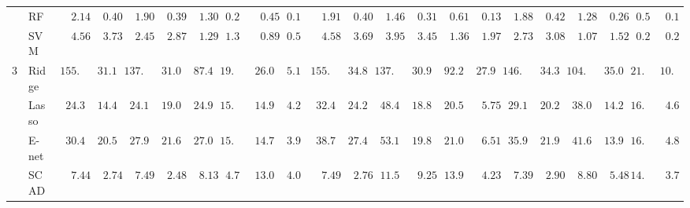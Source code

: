 \begin{tabular}{p{0.2cm}p{1cm}|p{0.6cm}p{0.6cm}|p{0.6cm}p{0.6cm}p{0.6cm}p{0.6cm}p{0.6cm}p{0.6cm}|p{0.6cm}p{0.6cm}p{0.6cm}p{0.6cm}p{0.6cm}p{0.6cm}|p{0.6cm}p{0.6cm}p{0.6cm}p{0.6cm}p{0.6cm}p{0.6cm}}
 & RF  & $\phantom{00}2.14$ & $\phantom{00}0.40$ & $\phantom{00}1.90$ & $\phantom{00}0.39$ & $\phantom{00}1.30$ & $\phantom{0}0.28$ & $\phantom{00}0.45$ & $\phantom{0}0.10$ & $\phantom{00}1.91$ & $\phantom{00}0.40$ & $\phantom{00}1.46$ & $\phantom{00}0.31$ & $\phantom{00}0.61$ & $\phantom{00}0.13$ & $\phantom{00}1.88$ & $\phantom{00}0.42$ & $\phantom{00}1.28$ & $\phantom{00}0.26$ & $\phantom{0}0.54$ & $\phantom{0}0.12$ \\
 & SVM  & $\phantom{00}4.56$ & $\phantom{00}3.73$ & $\phantom{00}2.45$ & $\phantom{00}2.87$ & $\phantom{00}1.29$ & $\phantom{0}1.35$ & $\phantom{00}0.89$ & $\phantom{0}0.54$ & $\phantom{00}4.58$ & $\phantom{00}3.69$ & $\phantom{00}3.95$ & $\phantom{00}3.45$ & $\phantom{00}1.36$ & $\phantom{00}1.97$ & $\phantom{00}2.73$ & $\phantom{00}3.08$ & $\phantom{00}1.07$ & $\phantom{00}1.52$ & $\phantom{0}0.22$ & $\phantom{0}0.21$ \\\hline
3 & Ridge  & $155.11$ & $\phantom{0}31.15$ & $137.31$ & $\phantom{0}31.01$ & $\phantom{0}87.42$ & $19.36$ & $\phantom{0}26.04$ & $\phantom{0}5.18$ & $155.75$ & $\phantom{0}34.85$ & $137.91$ & $\phantom{0}30.96$ & $\phantom{0}92.22$ & $\phantom{0}27.90$ & $146.37$ & $\phantom{0}34.31$ & $104.27$ & $\phantom{0}35.08$ & $21.61$ & $10.88$ \\
 & Lasso  & $\phantom{0}24.35$ & $\phantom{0}14.44$ & $\phantom{0}24.16$ & $\phantom{0}19.02$ & $\phantom{0}24.92$ & $15.15$ & $\phantom{0}14.97$ & $\phantom{0}4.20$ & $\phantom{0}32.48$ & $\phantom{0}24.29$ & $\phantom{0}48.45$ & $\phantom{0}18.89$ & $\phantom{0}20.59$ & $\phantom{00}5.75$ & $\phantom{0}29.14$ & $\phantom{0}20.27$ & $\phantom{0}38.08$ & $\phantom{0}14.24$ & $16.86$ & $\phantom{0}4.64$ \\
 & E-net  & $\phantom{0}30.45$ & $\phantom{0}20.58$ & $\phantom{0}27.98$ & $\phantom{0}21.68$ & $\phantom{0}27.04$ & $15.38$ & $\phantom{0}14.78$ & $\phantom{0}3.95$ & $\phantom{0}38.72$ & $\phantom{0}27.41$ & $\phantom{0}53.16$ & $\phantom{0}19.89$ & $\phantom{0}21.01$ & $\phantom{00}6.51$ & $\phantom{0}35.98$ & $\phantom{0}21.93$ & $\phantom{0}41.61$ & $\phantom{0}13.92$ & $16.97$ & $\phantom{0}4.85$ \\
 & SCAD  & $\phantom{00}7.44$ & $\phantom{00}2.74$ & $\phantom{00}7.49$ & $\phantom{00}2.48$ & $\phantom{00}8.13$ & $\phantom{0}4.71$ & $\phantom{0}13.05$ & $\phantom{0}4.07$ & $\phantom{00}7.49$ & $\phantom{00}2.76$ & $\phantom{0}11.59$ & $\phantom{00}9.25$ & $\phantom{0}13.93$ & $\phantom{00}4.23$ & $\phantom{00}7.39$ & $\phantom{00}2.90$ & $\phantom{00}8.80$ & $\phantom{00}5.48$ & $14.12$ & $\phantom{0}3.79$ \\

\end{tabular}
